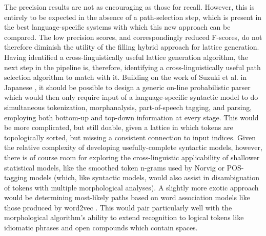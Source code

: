 The precision results are not as encouraging as those for recall. However, this is entirely to be expected in the absence of a path-selection step, which is present in the best language-specific systems with which this new approach can be compared. The low precision scores, and correspondingly reduced F-scores, do not therefore diminish the utility of the filling hybrid approach for lattice generation. Having identified a cross-linguistically useful lattice generation algorithm, the next step in the pipeline is, therefore, identifying a cross-linguistically useful path selection algorithm to match with it. Building on the work of Suzuki et al. in Japanese \cite{suzuki00}, it should be possible to design a generic on-line probabilistic parser which would then only require input of a language-specific syntactic model to do simultaneous tokenization, morphanalysis, part-of-speech tagging, and parsing, employing both bottom-up and top-down information at every stage. This would be more complicated, but still doable, given a lattice in which tokens are topologically sorted, but missing a consistent connection to input indices. Given the relative complexity of developing usefully-complete syntactic models, however, there is of course room for exploring the cross-linguistic applicability of shallower statistical models, like the smoothed token n-grams used by Norvig \cite{norvig14} or POS-tagging models (which, like syntactic models, would also assist in disambiguation of tokens with multiple morphological analyses). A slightly more exotic approach would be determining most-likely paths based on word association models like those produced by word2vec \cite{mikolov13}. This would pair particularly well with the morphological algorithm's ability to extend recognition to logical tokens like idiomatic phrases and open compounds which contain spaces.
